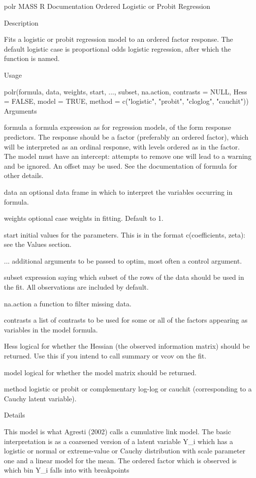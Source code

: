 polr {MASS}	R Documentation
Ordered Logistic or Probit Regression

Description

Fits a logistic or probit regression model to an ordered factor response. The default logistic case is proportional odds logistic regression, after which the function is named.

Usage

polr(formula, data, weights, start, ..., subset, na.action,
     contrasts = NULL, Hess = FALSE, model = TRUE,
     method = c("logistic", "probit", "cloglog", "cauchit"))
Arguments

formula	
a formula expression as for regression models, of the form response ~ predictors. The response should be a factor (preferably an ordered factor), which will be interpreted as an ordinal response, with levels ordered as in the factor. The model must have an intercept: attempts to remove one will lead to a warning and be ignored. An offset may be used. See the documentation of formula for other details.

data	
an optional data frame in which to interpret the variables occurring in formula.

weights	
optional case weights in fitting. Default to 1.

start	
initial values for the parameters. This is in the format c(coefficients, zeta): see the Values section.

...	
additional arguments to be passed to optim, most often a control argument.

subset	
expression saying which subset of the rows of the data should be used in the fit. All observations are included by default.

na.action	
a function to filter missing data.

contrasts	
a list of contrasts to be used for some or all of the factors appearing as variables in the model formula.

Hess	
logical for whether the Hessian (the observed information matrix) should be returned. Use this if you intend to call summary or vcov on the fit.

model	
logical for whether the model matrix should be returned.

method	
logistic or probit or complementary log-log or cauchit (corresponding to a Cauchy latent variable).

Details

This model is what Agresti (2002) calls a cumulative link model. The basic interpretation is as a coarsened version of a latent variable Y_i which has a logistic or normal or extreme-value or Cauchy distribution with scale parameter one and a linear model for the mean. The ordered factor which is observed is which bin Y_i falls into with breakpoints

